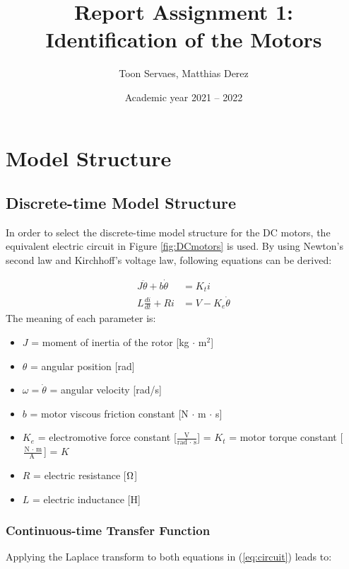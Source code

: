 \documentclass[a4paper,kul]{kulakarticle} %
\date{Academic year 2021 -- 2022}
\title{Report Assignment 1: Identification of the Motors}
\author{Toon Servaes, Matthias Derez}
\begin{document}
\maketitle

\section{Model Structure}
\subsection{Discrete-time Model Structure} 
\label{subsec:complex_model}
In order to select the discrete-time model structure for the DC motors, the equivalent electric circuit in Figure \ref{fig:DCmotors} is used. By using Newton's second law and Kirchhoff's voltage law, following equations can be derived:

\begin{equation}
    \label{eq:circuit}
    \begin{split}
         J\ddot{\theta}  + b\dot{\theta} &= K_{t}i \\
         L\frac{di}{dt} + Ri &= V - K_{e}\dot{\theta}
     \end{split} 
\end{equation}
The meaning of each parameter is:
\begin{itemize}
    \item $J$ = moment of inertia of the rotor [kg $\cdot$ m$^2$]
    \item $\theta$ = angular position [rad]
    \item $\omega = \dot{\theta}$ = angular velocity [rad/s]
    \item $b$ = motor viscous friction constant [N $\cdot$ m $\cdot$ s]
    \item $K_{e}$ = electromotive force constant [$\frac{\text{V}}{\text{rad } \cdot \text{ s}}$] = $K_{t}$ = motor torque constant [$\frac{\text{N } \cdot \text{ m}}{\text{A }}$] = $K$
    \item $R$ = electric resistance [$\ohm$]
    \item $L$ = electric inductance [H]
\end{itemize}

\subsubsection*{Continuous-time Transfer Function}
Applying the Laplace transform to both equations in (\ref{eq:circuit}) leads to:
\end{document}
